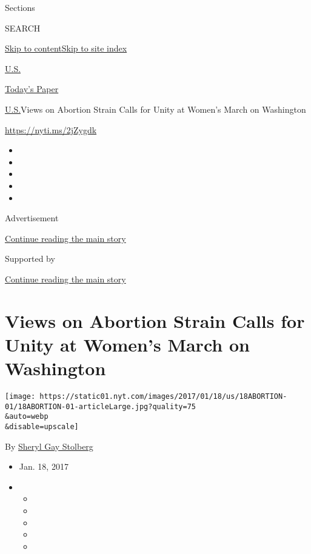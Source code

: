 Sections

SEARCH

\protect\hyperlink{site-content}{Skip to
content}\protect\hyperlink{site-index}{Skip to site index}

\href{https://www.nytimes.com/section/us}{U.S.}

\href{https://myaccount.nytimes.com/auth/login?response_type=cookie\&client_id=vi}{}

\href{https://www.nytimes.com/section/todayspaper}{Today's Paper}

\href{/section/us}{U.S.}\textbar{}Views on Abortion Strain Calls for
Unity at Women's March on Washington

\url{https://nyti.ms/2jZygdk}

\begin{itemize}
\item
\item
\item
\item
\item
\end{itemize}

Advertisement

\protect\hyperlink{after-top}{Continue reading the main story}

Supported by

\protect\hyperlink{after-sponsor}{Continue reading the main story}

\hypertarget{views-on-abortion-strain-calls-for-unity-at-womens-march-on-washington}{%
\section{Views on Abortion Strain Calls for Unity at Women's March on
Washington}\label{views-on-abortion-strain-calls-for-unity-at-womens-march-on-washington}}

\texttt{[image: https://static01.nyt.com/images/2017/01/18/us/18ABORTION-01/18ABORTION-01-articleLarge.jpg?quality=75\\\&auto=webp\\\&disable=upscale]}

By \href{http://www.nytimes.com/by/sheryl-gay-stolberg}{Sheryl Gay
Stolberg}

\begin{itemize}
\item
  Jan. 18, 2017
\item
  \begin{itemize}
  \item
  \item
  \item
  \item
  \item
  \end{itemize}
\end{itemize}

